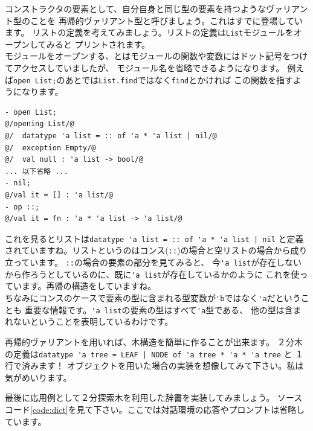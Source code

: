 \documentclass[11pt,a4paper]{article}
\begin{document}
コンストラクタの要素として、自分自身と同じ型の要素を持つようなヴァリアント型のことを
再帰的ヴァリアント型と呼びましょう。これはすでに登場しています。
リストの定義を考えてみましょう。リストの定義は\lstinline{List}モジュールをオープンしてみると
プリントされます。\\
モジュールをオープンする、とはモジュールの関数や変数にはドット記号をつけてアクセスしていましたが、
モジュール名を省略できるようになります。
例えば\lstinline{open List;}のあとでは\lstinline{List.find}ではなく\lstinline{find}とかければ
この関数を指すようになります。

\begin{lstlisting}[caption=リストの定義を確認する,label=code:open-list]
- open List;
@/opening List/@
@/  datatype 'a list = :: of 'a * 'a list | nil/@
@/  exception Empty/@
@/  val null : 'a list -> bool/@
... 以下省略 ...
- nil;
@/val it = [] : 'a list/@
- op ::;
@/val it = fn : 'a * 'a list -> 'a list/@
\end{lstlisting}

これを見るとリストは\lstinline{datatype 'a list = :: of 'a * 'a list | nil}
と定義されていますね。リストというのはコンス(\lstinline{::})の場合と空リストの場合から成り立っています。
\lstinline{::}の場合の要素の部分を見てみると、
今\lstinline{'a list}が存在しないから作ろうとしているのに、既に\lstinline{'a list}が存在しているかのように
これを使っています。再帰の構造をしていますね。\\
ちなみにコンスのケースで要素の型に含まれる型変数が\lstinline{'b}ではなく\lstinline{'a}だということも
重要な情報です。\lstinline{'a list}の要素の型はすべて\lstinline{'a}型である、
他の型は含まれないということを表明しているわけです。

再帰的ヴァリアントを用いれば、木構造を簡単に作ることが出来ます。
２分木の定義は\lstinline{datatype 'a tree = LEAF | NODE of 'a tree * 'a * 'a tree} と
１行で済みます！
オブジェクトを用いた場合の実装を想像してみて下さい。私は気がめいります。

最後に応用例として２分探索木を利用した辞書を実装してみましょう。
ソースコード\ref{code:dict}を見て下さい。ここでは対話環境の応答やプロンプトは省略しています。
\end{document}

